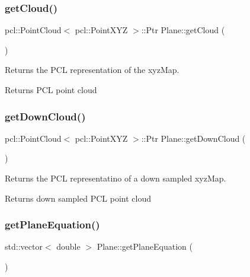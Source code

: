 \hypertarget{class_plane_a89c277f419ffb0e9d53f29127109465b}{}\label{class_plane_a89c277f419ffb0e9d53f29127109465b} 
\subsubsection{\texorpdfstring{get\+Cloud()}{getCloud()}}
{\footnotesize\ttfamily pcl\+::\+Point\+Cloud$<$ pcl\+::\+Point\+X\+YZ $>$\+::Ptr Plane\+::get\+Cloud (\begin{DoxyParamCaption}{ }\end{DoxyParamCaption})}



Returns the P\+CL representation of the xyz\+Map. 

\begin{DoxyReturn}{Returns}
P\+CL point cloud 
\end{DoxyReturn}
\hypertarget{class_plane_abad6f7c26005ad7ab847af5acaad9c31}{}\label{class_plane_abad6f7c26005ad7ab847af5acaad9c31} 
\subsubsection{\texorpdfstring{get\+Down\+Cloud()}{getDownCloud()}}
{\footnotesize\ttfamily pcl\+::\+Point\+Cloud$<$ pcl\+::\+Point\+X\+YZ $>$\+::Ptr Plane\+::get\+Down\+Cloud (\begin{DoxyParamCaption}{ }\end{DoxyParamCaption})}



Returns the P\+CL representatino of a down sampled xyz\+Map. 

\begin{DoxyReturn}{Returns}
down sampled P\+CL point cloud 
\end{DoxyReturn}
\hypertarget{class_plane_aafedb091ba358d46d5203c4e0eb6e838}{}\label{class_plane_aafedb091ba358d46d5203c4e0eb6e838} 
\subsubsection{\texorpdfstring{get\+Plane\+Equation()}{getPlaneEquation()}}
{\footnotesize\ttfamily std\+::vector$<$ double $>$ Plane\+::get\+Plane\+Equation (\begin{DoxyParamCaption}{ }\end{DoxyParamCaption})}



